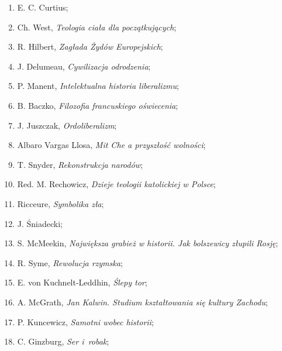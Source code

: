 \documentclass[a4paper,11pt]{article}
\begin{document}
\vspace{\spaceTwo}


\begin{enumerate}

\item E. C. Curtius;

\item Ch. West, \emph{Teologia ciała dla początkujących};

\item R. Hilbert, \emph{Zagłada Żydów Europejskich};

\item J. Delumeau, \emph{Cywilizacja odrodzenia};

\item P. Manent, \emph{Intelektualna historia liberalizmu};

\item B. Baczko, \emph{Filozofia francuskiego oświecenia};

\item J. Juszczak, \emph{Ordoliberalizm};

\item Albaro Vargas Llosa, \emph{Mit Che a przyszłość wolności};

\item T. Snyder, \emph{Rekonstrukcja narodów};

\item Red. M. Rechowicz, \emph{Dzieje teologii katolickiej w Polsce};

\item Ricceure, \emph{Symbolika zła};

\item J. Śniadecki;

\item S. McMeekin, \emph{Największa grabież w historii. Jak bolszewicy
    złupili Rosję};

\item R. Syme, \emph{Rewolucja rzymska};

\item E. von Kuchnelt-Leddhin, \emph{Ślepy tor};

\item A. McGrath, \emph{Jan Kalwin. Studium kształtowania się kultury
    Zachodu};

\item P. Kuncewicz, \emph{Samotni wobec historii};

\item C. Ginzburg, \emph{Ser i~robak};


\end{enumerate}
\end{document}
